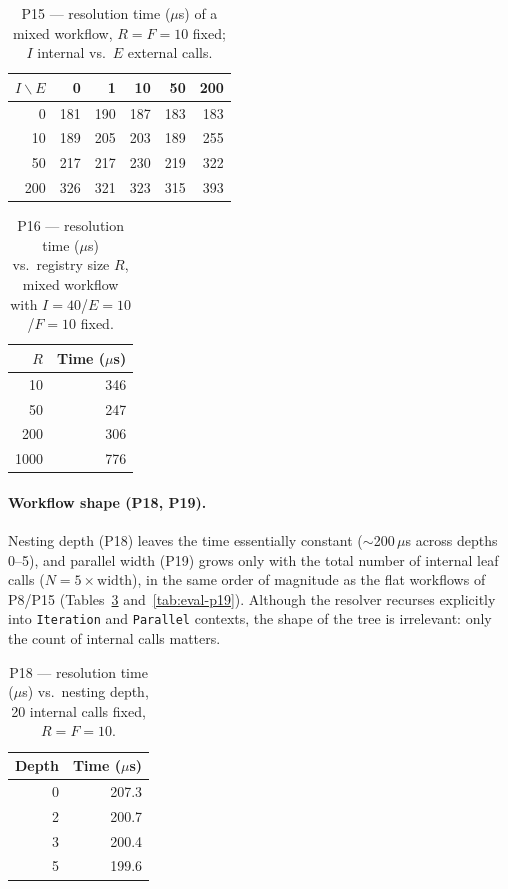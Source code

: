 \begin{table}[htbp]
  \centering
  \caption{P15 --- resolution time ($\mu$s) of a mixed workflow, $R{=}F{=}10$ fixed;
  $I$ internal vs.\ $E$ external calls.}
  \label{tab:eval-p15}
  \begin{tabular}{rrrrrr}
    \hline
    $I\backslash E$ & 0 & 1 & 10 & 50 & 200 \\
    \hline
    0   & 181 & 190 & 187 & 183 & 183 \\
    10  & 189 & 205 & 203 & 189 & 255 \\
    50  & 217 & 217 & 230 & 219 & 322 \\
    200 & 326 & 321 & 323 & 315 & 393 \\
    \hline
  \end{tabular}
\end{table}

\begin{table}[htbp]
  \centering
  \caption{P16 --- resolution time ($\mu$s) vs.\ registry size $R$, mixed workflow with
  $I{=}40$/$E{=}10$/$F{=}10$ fixed.}
  \label{tab:eval-p16}
  \begin{tabular}{rr}
    \hline
    \textbf{$R$} & \textbf{Time ($\mu$s)} \\
    \hline
    10   & 346 \\
    50   & 247 \\
    200  & 306 \\
    1000 & 776 \\
    \hline
  \end{tabular}
\end{table}

\paragraph{Workflow shape (P18, P19).}
Nesting depth (P18) leaves the time essentially constant ($\sim$200\,$\mu$s across depths 0--5),
and parallel width (P19) grows only with the total number of internal leaf calls
($N = 5\times\text{width}$), in the same order of magnitude as the flat workflows of P8/P15
(Tables~\ref{tab:eval-p18} and~\ref{tab:eval-p19}). Although the resolver recurses explicitly into
\texttt{Iteration} and \texttt{Parallel} contexts, the shape of the tree is irrelevant: only the
count of internal calls matters.

\begin{table}[htbp]
  \centering
  \caption{P18 --- resolution time ($\mu$s) vs.\ nesting depth, 20 internal calls fixed,
  $R{=}F{=}10$.}
  \label{tab:eval-p18}
  \begin{tabular}{rr}
    \hline
    \textbf{Depth} & \textbf{Time ($\mu$s)} \\
    \hline
    0 & 207.3 \\
    2 & 200.7 \\
    3 & 200.4 \\
    5 & 199.6 \\
    \hline
  \end{tabular}
\end{table}

